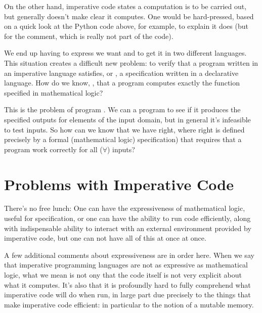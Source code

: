 \documentclass[letterpaper,10pt,english]{sphinxmanual}
\begin{document}
On the other hand, imperative code states  a computation is to be
carried out, but generally doesn’t make clear  it computes. One
would be hard-pressed, based on a quick look at the Python code above,
for example, to explain  it does (but for the comment, which is
really not part of the code).

We end up having to express  we want and  to get it in two
different languages. This situation creates a difficult new problem:
to verify that a program written in an imperative language satisfies,
or , a specification written in a declarative language.  How
do we know, , that a program computes exactly the function
specified in mathematical logic?

This is the problem of program . We can  a program
to see if it produces the specified outputs for  elements of the
input domain, but in general it’s infeasible to test  inputs. So
how can we know that we have  right, where right is
defined precisely by a formal (mathematical logic) specification) that
requires that a program work correctly for all (\(\forall\)) inputs?


\chapter{Problems with Imperative Code}
\label{\detokenize{03-problems-with-imperative-code:problems-with-imperative-code}}\label{\detokenize{03-problems-with-imperative-code::doc}}
There’s no free lunch: One can have the expressiveness of mathematical
logic, useful for specification, or one can have the ability to run
code efficiently, along with indispensable ability to interact with an
external environment provided by imperative code, but one can not have
all of this at once at once.

A few additional comments about expressiveness are in order here. When
we say that imperative programming languages are not as expressive as
mathematical logic, what we mean is not ony that the code itself is not
very explicit about what it computes. It’s also that it is profoundly
hard to fully comprehend what imperative code will do when run, in large
part due precisely to the things that make imperative code efficient: in
particular to the notion of a mutable memory.
\end{document}
